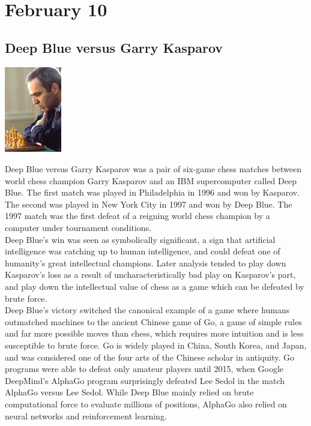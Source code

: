 \documentclass[11pt]{report}
\begin{document}
\section{February 10}
\subsection{Deep Blue versus Garry Kasparov}
\vspace{2mm}\begin{center}\includegraphics[width=2.5cm]{./img/kasparov.jpg}\end{center}
Deep Blue versus Garry Kasparov was a pair of six-game chess matches between world chess champion Garry Kasparov and an IBM supercomputer called Deep Blue. The first match was played in Philadelphia in 1996 and won by Kasparov. The second was played in New York City in 1997 and won by Deep Blue. The 1997 match was the first defeat of a reigning world chess champion by a computer under tournament conditions.\\ \indent Deep Blue's win was seen as symbolically significant, a sign that artificial intelligence was catching up to human intelligence, and could defeat one of humanity's great intellectual champions. Later analysis tended to play down Kasparov's loss as a result of uncharacteristically bad play on Kasparov's part, and play down the intellectual value of chess as a game which can be defeated by brute force.\\ \indent Deep Blue's victory switched the canonical example of a game where humans outmatched machines to the ancient Chinese game of Go, a game of simple rules and far more possible moves than chess, which requires more intuition and is less susceptible to brute force. Go is widely played in China, South Korea, and Japan, and was considered one of the four arts of the Chinese scholar in antiquity. Go programs were able to defeat only amateur players until 2015, when Google DeepMind's AlphaGo program surprisingly defeated Lee Sedol in the match AlphaGo versus Lee Sedol. While Deep Blue mainly relied on brute computational force to evaluate millions of positions, AlphaGo also relied on neural networks and reinforcement learning.
\end{document}
